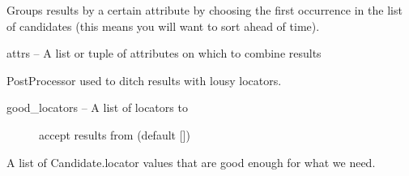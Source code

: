 \documentclass[letterpaper,10pt,english]{sphinxmanual}
\begin{document}

\begin{fulllineitems}
\label{index:omgeo.processors.postprocessors.GroupByMultiple}
Groups results by a certain attribute by choosing the
first occurrence in the list of candidates 
(this means you will want to sort ahead of time).

attrs   --  A list or tuple of attributes on which to combine results

\end{fulllineitems}


\begin{fulllineitems}
\label{index:omgeo.processors.postprocessors.LocatorFilter}
PostProcessor used to ditch results with lousy locators.
\begin{description}
\item[{good\_locators   --  A list of locators to}] \leavevmode
accept results from (default {[}{]})

\end{description}

\begin{fulllineitems}
\label{index:omgeo.processors.postprocessors.LocatorFilter.good_locators}
A list of Candidate.locator values that are good enough for what we need.

\end{fulllineitems}


\end{fulllineitems}

\end{document}
